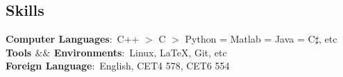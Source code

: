 \documentclass[margin]{res}
\begin{document}
\begin{resume}
\section{Skills}
\textbf{Computer Languages}:~C++ $>$ C $>$  Python = Matlab = Java = C$\sharp$, etc\\
\textbf{Tools $\&\&$ Environments}:~Linux, \LaTeX, Git, etc\\
\textbf{Foreign Language}:~English, CET4 578, CET6 554\\







\end{resume}
\end{document}
